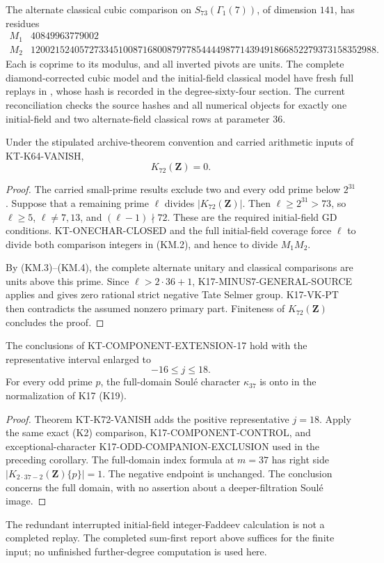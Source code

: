 The alternate classical cubic comparison on
$S_{73}(\Gamma_1(7))$, of dimension $141$, has residues
\[
\begin{array}{c|r}
 M_1&40849963779002\\
 M_2&12002152405727334510087168008797785444498771439491866852279373158352988.
\end{array}                                                     \tag{KM.4}
\]
Each is coprime to its modulus, and all inverted pivots
are units.  The complete diamond-corrected cubic model
and the initial-field classical model have fresh full
replays in , whose hash
is recorded in the degree-sixty-four section.  The current
reconciliation checks the source hashes and all numerical
objects for exactly one initial-field and two alternate-field
classical rows at parameter $36$.

\begin{theorem}[KT-K72-VANISH]
\label{thm:kt-k72-vanish}
Under the stipulated archive-theorem convention and
carried arithmetic inputs of KT-K64-VANISH,
\[
                              K_{72}(\mathbf Z)=0.
\]
\end{theorem}
\begin{proof}
The carried small-prime results exclude two and every odd
prime below $2^{31}$.  Suppose that a remaining prime
$\ell$ divides $|K_{72}(\mathbf Z)|$.  Then
$\ell\geq2^{31}>73$, so $\ell\geq5$, $\ell\ne7,13$,
and $(\ell-1)\nmid72$.  These are the required initial-field
GD conditions.  KT-ONECHAR-CLOSED and the full initial-field
coverage force $\ell$ to divide both comparison integers
in (KM.2), and hence to divide $M_1M_2$.

By (KM.3)--(KM.4), the complete alternate unitary and
classical comparisons are units above this prime.  Since
$\ell>2\cdot36+1$, K17-MINUS7-GENERAL-SOURCE applies
and gives zero rational strict negative Tate Selmer group.
K17-VK-PT then contradicts the assumed nonzero primary
part.  Finiteness of $K_{72}(\mathbf Z)$ concludes the proof.
\end{proof}

\begin{corollary}
The conclusions of KT-COMPONENT-EXTENSION-17 hold with
the representative interval enlarged to
\[
                             -16\leq j\leq18.
\]
For every odd prime $p$, the full-domain Soul\'e character
$\kappa_{37}$ is onto in the normalization of K17 (K19).
\end{corollary}
\begin{proof}
Theorem KT-K72-VANISH adds the positive representative
$j=18$.  Apply the same exact (K2) comparison,
K17-COMPONENT-CONTROL, and exceptional-character
K17-ODD-COMPANION-EXCLUSION used in the preceding
corollary.  The full-domain index formula at $m=37$ has
right side $|K_{2\cdot37-2}(\mathbf Z)\{p\}|=1$.
The negative endpoint is unchanged.  The conclusion
concerns the full domain, with no assertion about a
deeper-filtration Soul\'e image.
\end{proof}

The redundant interrupted initial-field integer-Faddeev
calculation is not a completed replay.  The completed
sum-first report above suffices for the finite input;
no unfinished further-degree computation is used here.
